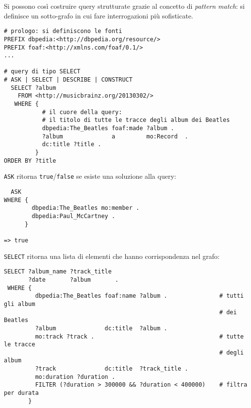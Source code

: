 \documentclass[11pt]{article}
\begin{document}
Si possono così costruire query strutturate grazie al concetto di \textit{pattern match}: si definisce un sotto-grafo in cui fare interrogazioni più sofisticate.
\begin{verbatim}
# prologo: si definiscono le fonti
PREFIX dbpedia:<http://dbpedia.org/resource/>
PREFIX foaf:<http://xmlns.com/foaf/0.1/>
...

# query di tipo SELECT
# ASK | SELECT | DESCRIBE | CONSTRUCT
  SELECT ?album
    FROM <http://musicbrainz.org/20130302/>
   WHERE {
           # il cuore della query:
           # il titolo di tutte le tracce degli album dei Beatles
           dbpedia:The_Beatles foaf:made ?album .
           ?album              a         mo:Record  .
           dc:title ?title .
         }
ORDER BY ?title
\end{verbatim}

\verb|ASK| ritorna \verb|true|/\verb|false| se esiste una soluzione alla query:
\begin{verbatim}
  ASK
WHERE {
        dbpedia:The_Beatles mo:member .
        dbpedia:Paul_McCartney .
      }

=> true
\end{verbatim}

\verb|SELECT| ritorna una lista di elementi che hanno corrispondenza nel grafo:
\begin{verbatim}
SELECT ?album_name ?track_title
       ?date       ?album       .
 WHERE {
         dbpedia:The_Beatles foaf:name ?album .               # tutti gli album
                                                              # dei Beatles
         ?album              dc:title  ?album .
         mo:track ?track .                                    # tutte le tracce
                                                              # degli album
         ?track              dc:title  ?track_title .
         mo:duration ?duration .
         FILTER (?duration > 300000 && ?duration < 400000)    # filtra per durata
       }
\end{verbatim}
\end{document}

